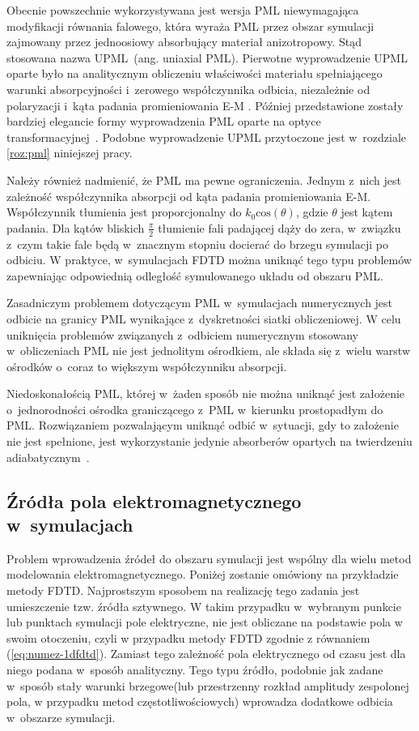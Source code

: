 Obecnie powszechnie wykorzystywana jest wersja PML niewymagająca modyfikacji równania falowego, która wyraża PML przez obszar symulacji zajmowany przez jednoosiowy absorbujący materiał anizotropowy. Stąd stosowana nazwa UPML~(ang. uniaxial PML). Pierwotne wyprowadzenie UPML oparte było na analitycznym obliczeniu właściwości materiału spełniającego warunki absorpcyjności i~zerowego współczynnika odbicia, niezależnie od polaryzacji i~kąta padania promieniowania E-M  \cite{sacks1995perfectly}. Później przedstawione zostały bardziej elegancie formy wyprowadzenia PML oparte na optyce transformacyjnej~\cite{rappaport1995perfectly}. Podobne wyprowadzenie UPML przytoczone jest w~rozdziale \ref{roz:pml} niniejszej pracy.

Należy również nadmienić, że PML ma pewne ograniczenia. Jednym z~nich jest zależność współczynnika absorpcji od kąta padania promieniowania E-M. Współczynnik tłumienia jest proporcjonalny do $k_0 \textrm{cos}(\theta)$, gdzie $\theta$ jest kątem padania. Dla kątów bliskich $\frac{\pi}{2}$ tłumienie fali padającej dąży do zera, w~związku z~czym takie fale będą w~znacznym stopniu docierać do brzegu symulacji po odbiciu. W praktyce, w~symulacjach FDTD można uniknąć tego typu problemów zapewniając odpowiednią odległość symulowanego układu od obszaru PML.


Zasadniczym problemem dotyczącym PML w~symulacjach numerycznych jest odbicie na granicy PML wynikające z~dyskretności siatki obliczeniowej. W celu uniknięcia problemów związanych z~odbiciem numerycznym stosowany w~obliczeniach PML nie jest jednolitym ośrodkiem, ale składa się z~wielu warstw ośrodków o~coraz to większym współczynniku absorpcji.

Niedoskonałością PML, której w~żaden sposób nie można uniknąć jest założenie o~jednorodności ośrodka graniczącego z~PML w~kierunku prostopadłym do PML. Rozwiązaniem pozwalającym uniknąć odbić w~sytuacji, gdy to założenie nie jest spełnione, jest wykorzystanie jedynie absorberów opartych na twierdzeniu adiabatycznym~\cite{oskooi2008failure}.

\subsection{Źródła pola elektromagnetycznego w~symulacjach}
Problem wprowadzenia źródeł do obszaru symulacji jest wspólny dla wielu metod modelowania elektromagnetycznego. Poniżej zostanie omówiony na przykładzie metody FDTD. Najprostszym sposobem na realizację tego zadania jest umieszczenie tzw. źródła sztywnego. W takim przypadku w~wybranym punkcie lub punktach symulacji pole elektryczne, nie jest obliczane na podstawie pola w swoim otoczeniu, czyli w przypadku metody FDTD zgodnie z równaniem (\ref{eq:numez-1dfdtd}). Zamiast tego zależność pola elektrycznego od czasu jest dla niego podana w~sposób analityczny. Tego typu źródło, podobnie jak zadane w~sposób stały warunki brzegowe(lub przestrzenny rozkład amplitudy zespolonej pola, w przypadku metod częstotliwościowych) wprowadza dodatkowe odbicia w~obszarze symulacji.

